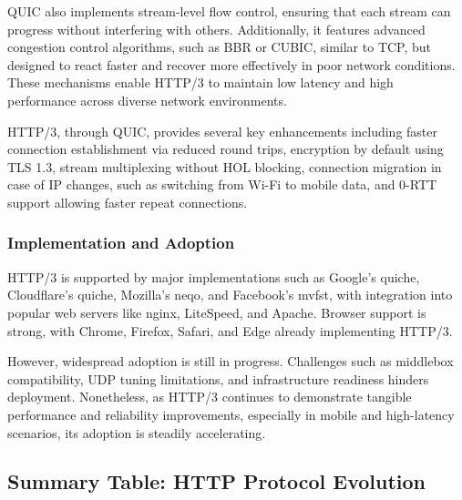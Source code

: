 QUIC also implements stream-level flow control, ensuring that each stream can progress without interfering with others. Additionally, it features advanced congestion control algorithms, such as BBR or CUBIC, similar to TCP, but designed to react faster and recover more effectively in poor network conditions. These mechanisms enable HTTP/3 to maintain low latency and high performance across diverse network environments.

HTTP/3, through QUIC, provides several key enhancements including faster connection establishment via reduced round trips, encryption by default using TLS 1.3, stream multiplexing without HOL blocking, connection migration in case of IP changes, such as switching from Wi-Fi to mobile data, and 0-RTT support allowing faster repeat connections.


\subsubsection{Implementation and Adoption}

HTTP/3 is supported by major implementations such as Google’s quiche, Cloudflare’s quiche, Mozilla’s neqo, and Facebook’s mvfst, with integration into popular web servers like nginx, LiteSpeed, and Apache. Browser support is strong, with Chrome, Firefox, Safari, and Edge already implementing HTTP/3.

However, widespread adoption is still in progress. Challenges such as middlebox compatibility, UDP tuning limitations, and infrastructure readiness hinders deployment. Nonetheless, as HTTP/3 continues to demonstrate tangible performance and reliability improvements, especially in mobile and high-latency scenarios, its adoption is steadily accelerating.


\subsection{Summary Table: HTTP Protocol Evolution}

